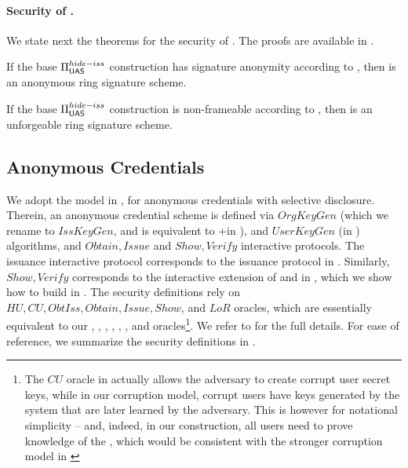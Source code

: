 
\paragraph{Security of \CUASRing.} %
We state next the theorems for the security of \CUASRing. The proofs are
available in .

\begin{theorem}
  If the base $\Pi_{\mathsf{UAS}}^{hide-iss}$ construction has signature anonymity
  according to , then \CUASRing is an anonymous
  ring signature scheme.
\end{theorem}

\begin{theorem}
  If the base $\Pi_{\mathsf{UAS}}^{hide-iss}$ construction is non-frameable according to
  , then \CUASRing is an unforgeable ring signature
  scheme.
\end{theorem}

\subsection{Anonymous Credentials}
\label{ssec:related-models-ac}

We adopt the model in \cite{fhs19}, for anonymous credentials with selective
disclosure. Therein, an anonymous credential scheme is defined via $OrgKeyGen$
(which we rename to $IssKeyGen$, and is equivalent to \KeyGen+\ISet in \UAS),
and $UserKeyGen$ (\KeyGen in \UAS) algorithms, and $Obtain,Issue$ and $Show,
Verify$ interactive protocols. The issuance interactive protocol corresponds to
the issuance protocol in \UAS. Similarly, $Show,Verify$ corresponds to
the interactive extension of \Sign and \Verify in \UAS, which we show how
to build in . The security definitions rely on
$HU, CU, ObtIss, Obtain, Issue, Show$, and $LoR$ oracles, which are essentially
equivalent to our \HUGEN, \CUGEN, \OBTISS, \OBTAIN, \ISSUE, \SIGN, and \CHALb
oracles\footnote{The $CU$ oracle in \cite{fhs19} actually allows the adversary
  to create corrupt user secret keys, while in our corruption model, corrupt
  users have keys generated by the system that are later learned by the
  adversary. This is however for notational simplicity -- and, indeed, in our
  construction, all users need to prove knowledge of the \usk, which would be
  consistent with the stronger corruption model in \cite{fhs19}}. We refer to
\cite{fhs19} for the full details. For ease of reference, we summarize the
security definitions in .%

